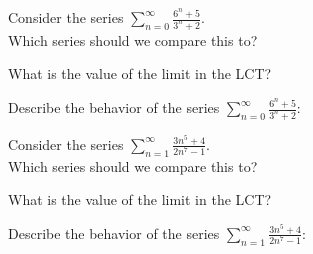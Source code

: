 \documentclass{ximera}
\begin{document}
\begin{problem}
Consider the series $\displaystyle{\sum_{n=0}^\infty \frac{6^n + 5}{3^n + 2}}$.\\
Which series should we compare this to?

\begin{multipleChoice}
\end{multipleChoice}

What is the value of the limit in the LCT?
\begin{multipleChoice}
\end{multipleChoice}

Describe the behavior of the series $\displaystyle{\sum_{n=0}^\infty \frac{6^n + 5}{3^n + 2}:}$
\begin{multipleChoice}
\end{multipleChoice}

\end{problem}




\begin{problem}
Consider the series $\displaystyle{\sum_{n=1}^\infty \frac{3n^5 + 4}{2n^7 - 1}}$.\\
Which series should we compare this to?

\begin{multipleChoice}
\end{multipleChoice}

What is the value of the limit in the LCT?
\begin{multipleChoice}
\end{multipleChoice}

Describe the behavior of the series $\displaystyle{\sum_{n=1}^\infty \frac{3n^5 + 4}{2n^7 - 1}:}$
\begin{multipleChoice}
\end{multipleChoice}

\end{problem}
\end{document}
